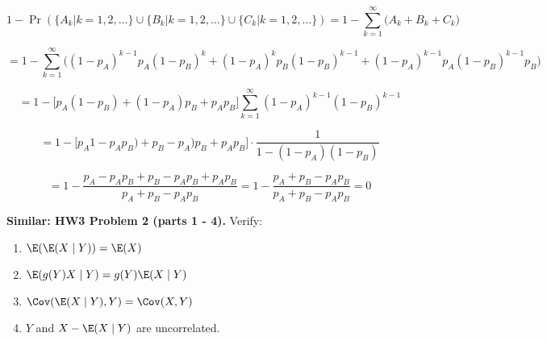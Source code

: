 \begin{enumerate}[(a)]
\[
1 - \Pr(\{A_k | k = 1, 2, \ldots\} \cup \{B_k | k = 1, 2, \ldots\} \cup \{C_k | k = 1, 2, \ldots\}) = 1 - \sum_{k = 1}^\infty \big(A_k + B_k + C_k\big)
\]

\[
= 1 - \sum_{k=1}^\infty \big( (1 - p_A)^{{k-1}}p_A(1 - p_B)^{k} + (1 - p_A)^{{k}}p_B(1 - p_B)^{k-1} + (1 - p_A)^{{k-1}}p_A(1 - p_B)^{k-1}p_B \big)
\]

\[
= 1 -   \big[p_A(1 - p_B) + (1 - p_A)p_B + p_Ap_B \big] \sum_{k=1}^\infty (1 - p_A)^{k-1}(1 - p_B)^{k-1} 
\]

\[
=  1 -  \big[ p_A1 - p_A p_B) + p_B - p_A)p_B + p_Ap_B \big] \cdot \frac{1}{1 - (1 - p_A)(1 - p_B)}
\]

\[
=1 -  \frac{p_A - p_Ap_B + p_B - p_Ap_B + p_Ap_B}{p_A + p_B - p_Ap_B} = 1 -  \frac{p_A + p_B - p_Ap_B}{p_A + p_B - p_Ap_B} = \boxed{0}
\]

\end{enumerate}

%
%
%
%

\textbf{Similar: HW3 Problem 2 (parts 1 - 4).} Verify:

\begin{enumerate}[(1)]

\item \(\E(\E(X\mid Y)) = \E(X)\)

\item \( \E(g(Y) X \mid Y) = g(Y) \E(X \mid Y) \)

\item \(\Cov ( \E(X \mid Y), Y ) = \Cov(X , Y)\)

\item \(Y\) and \(X - \E(X \mid Y)\) are uncorrelated.

\end{enumerate}

